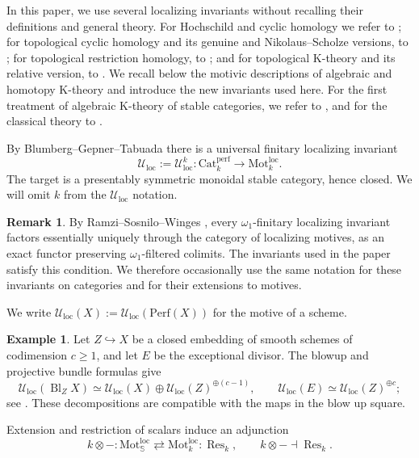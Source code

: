 \documentclass{amsart}
\theoremstyle{plain}
\theoremstyle{definition}
\newtheorem{remark}[prop]{Remark}
\newtheorem{example}[prop]{Example}
\newcommand{\bbS}{\mathbb{S}}
\newcommand{\Catperf}{\mathrm{Cat}^{\mathrm{perf}}}
\newcommand{\Perf}{\mathrm{Perf}}
\newcommand{\Motloc}{\mathrm{Mot}^{\mathrm{loc}}}
\newcommand{\Uloc}{\mathcal U_{\mathrm{loc}}}
\newcommand{\K}{\mathrm{K}}
\DeclareMathOperator{\Res}{Res}
\DeclareMathOperator{\Bl}{Bl}
\begin{document}
In this paper, we use several localizing invariants without recalling their definitions and general theory. For Hochschild and cyclic homology we refer to \cite{Kel99}; for topological cyclic homology and its genuine and Nikolaus--Scholze versions, to \cite{NS18}; for topological restriction homology, to \cite{KN17}; and for topological $\K$-theory and its relative version, to
\cite{Bla16,Mou19}. We recall below the motivic descriptions of algebraic and homotopy $\K$-theory and introduce the new invariants used here. For the first treatment of algebraic $\K$-theory of stable categories, we refer to \cite{Sch11}, and for the classical theory to \cite{Wei13}.


\medskip

By Blumberg--Gepner--Tabuada \cite{BGT13} there is a universal finitary localizing invariant
\[
\Uloc:=\Uloc^k\colon\Catperf_k\longrightarrow\Motloc_k.
\]
The target is a presentably
symmetric monoidal stable category, hence closed. We will omit $k$ from the $\Uloc$ notation.

\begin{remark}\label{omegaoneextension}
By Ramzi--Sosnilo--Winges \cite{RSW25}, every $\omega_1$-finitary localizing invariant factors essentially uniquely through the category of localizing motives, as an exact functor preserving $\omega_1$-filtered colimits.
The invariants used in the paper satisfy this condition. We therefore occasionally use the same notation for these invariants on categories and for their extensions to motives.
\end{remark}

We write $\Uloc(X):=\Uloc(\Perf(X))$ for the motive of a scheme.

\begin{example}\label{lciblowups}
Let $Z\hookrightarrow X$ be a closed embedding of smooth schemes of codimension $c\geq1$, and let $E$ be the exceptional divisor. The blowup and projective bundle formulas give
\[
\Uloc(\Bl_ZX)\simeq
\Uloc(X)\oplus\Uloc(Z)^{\oplus(c-1)},\qquad
\Uloc(E)\simeq\Uloc(Z)^{\oplus c};
\]
see \cite{Orl93}. These decompositions are compatible with the maps in the blow up square.
\end{example}

Extension and restriction of scalars induce an adjunction
\begin{equation}\label{basemotloc}
k\otimes -:\Motloc_\bbS\rightleftarrows\Motloc_k:\Res_k,
\qquad k\otimes -\dashv \Res_k.
\end{equation}
\end{document}
